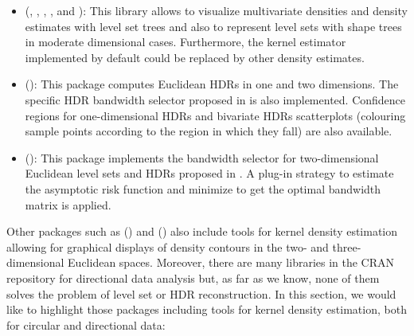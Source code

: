 \begin{itemize}
\item {} (\citealp{klemela2005algorithms}, \citealp{klemela2006visualization}, \citealp{klemela2008mode}, \citealp{klemela2009smoothing}, \citealp{holmstrom2017estimation} and \citealp{klepackage}): This library allows to visualize multivariate densities and density estimates with level set trees and also to represent level sets with shape trees in moderate dimensional cases. Furthermore, the kernel estimator implemented by default could be replaced by other density estimates.
	\item {} (\citealp{hyndman2018package}): This package computes Euclidean HDRs in one and two dimensions. The specific HDR bandwidth selector proposed in \cite{samworth2010asymptotics} is also implemented. Confidence regions for one-dimensional HDRs and bivariate HDRs scatterplots (colouring sample points according to the region in which they fall) are also available.
	\item  {} (\citealp{doss2018bandwidth}): This package implements the bandwidth selector for two-dimensional Euclidean level sets and HDRs proposed in \cite{doss2018bandwidth}.
	A plug-in strategy to estimate the asymptotic risk function and minimize to get the optimal bandwidth matrix is applied.
\end{itemize}

Other packages such as  (\citealp{sm}) and  (\citealp{duong2007ks}) also include tools for kernel density estimation allowing for graphical displays of density contours in the two- and three-dimensional Euclidean spaces. Moreover, there are many libraries in the CRAN repository for directional data analysis but, as far as we know, none of them solves the problem of level set or HDR reconstruction. In this section, we would like to highlight those packages including tools for kernel density estimation, both for circular and directional data:


